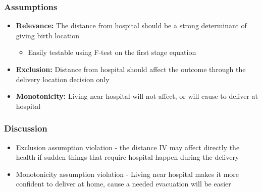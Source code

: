 \documentclass{beamer}
\begin{document}
\begin{frame}
  \frametitle{Assumptions}
  \begin{itemize}
    \item \textbf{Relevance:} The distance from hospital should be a strong determinant of giving birth location
    \begin{itemize}
      \item Easily testable using F-test on the first stage equation
    \end{itemize}
    \item \textbf{Exclusion:} Distance from hospital should affect the outcome through the delivery location decision only
    \item \textbf{Monotonicity:} Living near hospital will not affect, or will cause to deliver at hospital
  \end{itemize}
  \end{frame}

\begin{frame}
\frametitle{Discussion}
\begin{itemize}
\item Exclusion assumption violation - the distance IV may affect directly the health if sudden things that require hospital happen during the delivery
\item Monotonicity assumption violation - Living near hospital makes it more confident to deliver at home, cause a needed evacuation will be easier
\end{itemize}
\end{frame}
\end{document}
